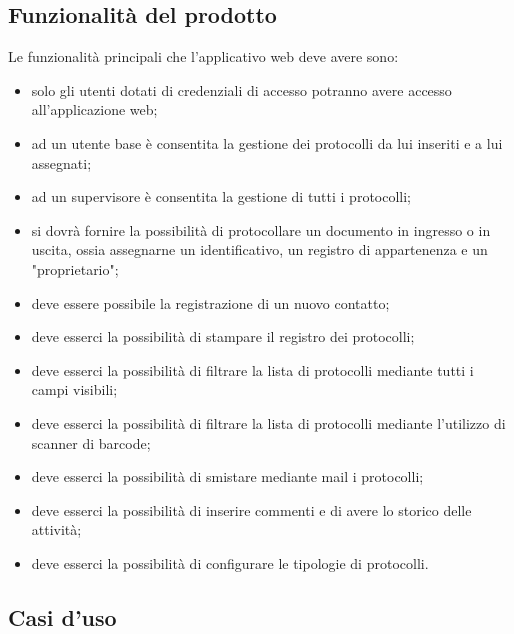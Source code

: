 \subsection{Funzionalità del prodotto}
Le funzionalità principali che l'applicativo web deve avere sono:
\begin{itemize}
        \item solo gli utenti dotati di credenziali di accesso potranno avere accesso all'applicazione web;
        
        \item ad un utente base è consentita la gestione dei protocolli da lui inseriti e a lui assegnati;
        
        \item ad un supervisore è consentita la gestione di tutti i protocolli;
        
        \item si dovrà fornire la possibilità di protocollare un documento in ingresso o in uscita, ossia assegnarne un identificativo, un registro di appartenenza e un "proprietario";
        
        \item deve essere possibile la registrazione di un nuovo contatto;
        
        \item deve esserci la possibilità di stampare il registro dei protocolli;

        \item deve esserci la possibilità di filtrare la lista di protocolli mediante tutti i campi visibili;
        
        \item deve esserci la possibilità di filtrare la lista di protocolli mediante l'utilizzo di scanner di barcode;
        
        \item deve esserci la possibilità di smistare mediante mail i protocolli;

        \item deve esserci la possibilità di inserire commenti e di avere lo storico delle attività;
        
        \item deve esserci la possibilità di configurare le tipologie di protocolli.
    \end{itemize}

\subsection{Casi d'uso}
